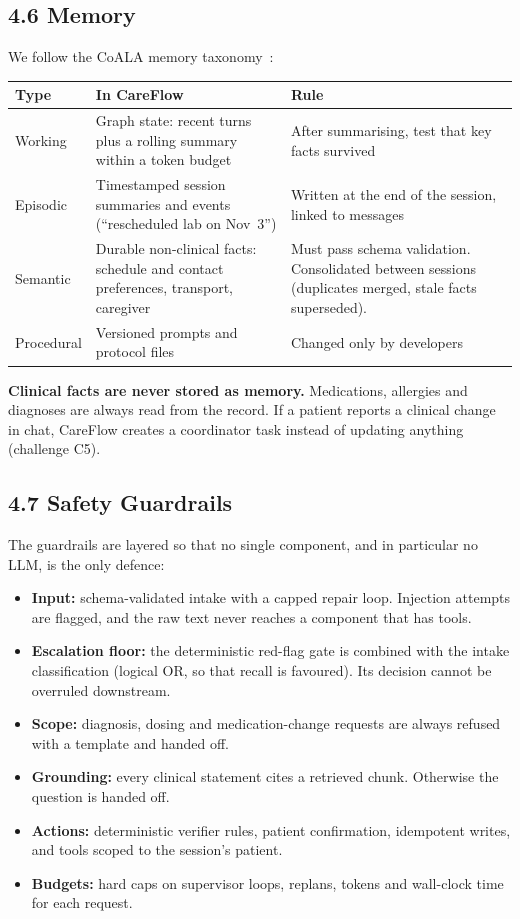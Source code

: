 \documentclass[11pt,a4paper]{article}
\begin{document}
\subsection*{4.6 Memory}

We follow the CoALA memory taxonomy~\cite{coala}:

\begin{center}
\small
\begin{tabularx}{\textwidth}{>{\raggedright\arraybackslash}p{2.2cm} L L}
\toprule
\textbf{Type} & \textbf{In CareFlow} & \textbf{Rule} \\
\midrule
Working & Graph state: recent turns plus a rolling summary within a token budget & After summarising, test that key facts survived \\
Episodic & Timestamped session summaries and events (``rescheduled lab on Nov~3'') & Written at the end of the session, linked to messages \\
Semantic & Durable non-clinical facts: schedule and contact preferences, transport, caregiver & Must pass schema validation. Consolidated between sessions (duplicates merged, stale facts superseded). \\
Procedural & Versioned prompts and protocol files & Changed only by developers \\
\bottomrule
\end{tabularx}
\end{center}

\textbf{Clinical facts are never stored as memory.} Medications, allergies and diagnoses are always read from the record. If a patient reports a clinical change in chat, CareFlow creates a coordinator task instead of updating anything (challenge C5).

\subsection*{4.7 Safety Guardrails}

The guardrails are layered so that no single component, and in particular no LLM, is the only defence:
\begin{itemize}
    \item \textbf{Input:} schema-validated intake with a capped repair loop. Injection attempts are flagged, and the raw text never reaches a component that has tools.
    \item \textbf{Escalation floor:} the deterministic red-flag gate is combined with the intake classification (logical OR, so that recall is favoured). Its decision cannot be overruled downstream.
    \item \textbf{Scope:} diagnosis, dosing and medication-change requests are always refused with a template and handed off.
    \item \textbf{Grounding:} every clinical statement cites a retrieved chunk. Otherwise the question is handed off.
    \item \textbf{Actions:} deterministic verifier rules, patient confirmation, idempotent writes, and tools scoped to the session's patient.
    \item \textbf{Budgets:} hard caps on supervisor loops, replans, tokens and wall-clock time for each request.
\end{itemize}
\end{document}
